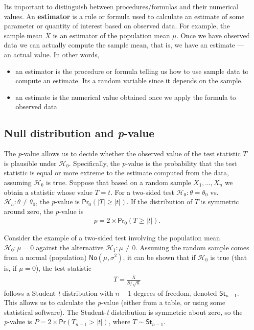\documentclass[
  11pt,
  letterpaper,
]{book}
\providecommand{\tightlist}{%
  \setlength{\itemsep}{0pt}\setlength{\parskip}{0pt}}
\theoremstyle{definition}
\theoremstyle{definition}
\theoremstyle{definition}
\theoremstyle{definition}
\theoremstyle{remark}
\begin{document}
Its important to distinguish between procedures/formulas and their numerical values. An \textbf{estimator} is a rule or formula used to calculate an estimate of some parameter or quantity of interest based on observed data. For example, the sample mean \(\bar{X}\) is an estimator of the population mean \(\mu\). Once we have observed data we can actually compute the sample mean, that is, we have an estimate --- an actual value. In other words,

\begin{itemize}
\tightlist
\item
  an estimator is the procedure or formula telling us how to use sample data to compute an estimate. Its a random variable since it depends on the sample.
\item
  an estimate is the numerical value obtained once we apply the formula to observed data
\end{itemize}

\hypertarget{null-distribution-and-p-value}{%
\subsection{\texorpdfstring{Null distribution and \emph{p}-value}{Null distribution and p-value}}\label{null-distribution-and-p-value}}

The \emph{p}-value allows us to decide whether the observed value of the test statistic \(T\) is plausible under \(\mathscr{H}_0\). Specifically, the \emph{p}-value is the probability that the test statistic is equal or more extreme to the estimate computed from the data, assuming \(\mathscr{H}_0\) is true. Suppose that based on a random sample \(X_1, \ldots, X_n\) we obtain a statistic whose value \(T=t\). For a two-sided test \(\mathscr{H}_0:\theta=\theta_0\) vs.~\(\mathscr{H}_a:\theta \neq \theta_0\), the \emph{p}-value is \(\mathsf{Pr}_0(|T| \geq |t|)\). If the distribution of \(T\) is symmetric around zero, the \emph{p}-value is
\begin{align*}
p = 2 \times \mathsf{Pr}_0(T \geq |t|).
\end{align*}

Consider the example of a two-sided test involving the population mean \(\mathscr{H}_0:\mu=0\) against the alternative \(\mathscr{H}_1:\mu \neq 0\). Assuming the random sample comes from a normal (population) \(\mathsf{No}(\mu, \sigma^2)\), it can be shown that if \(\mathscr{H}_0\) is true (that is, if \(\mu=0\)), the test statistic
\begin{align*}
T = \frac{\overline{X}}{S/\sqrt{n}}
\end{align*}
follows a Student-\emph{t} distribution with \(n-1\) degrees of freedom, denoted \(\mathsf{St}_{n-1}\). This allows us to calculate the \emph{p}-value (either from a table, or using some statistical software). The Student-\emph{t} distribution is symmetric about zero, so the \emph{p}-value is \(P = 2\times\mathsf{Pr}(T_{n-1} > |t|)\), where \(T \sim \mathsf{St}_{n-1}\).
\end{document}

